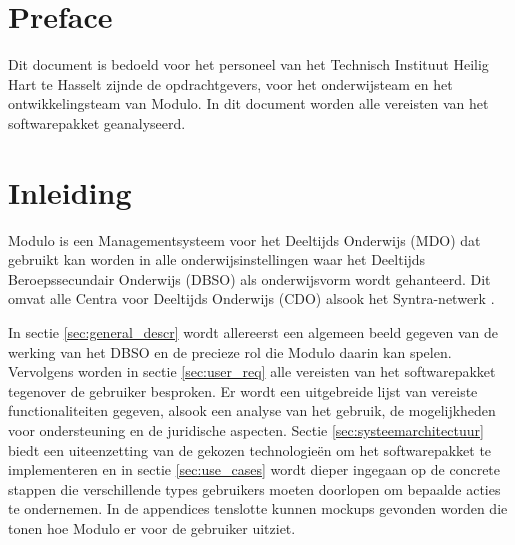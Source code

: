\documentclass[a4paper]{article}
\begin{document}


\tableofcontents
\newpage

\section{Preface}
Dit document is bedoeld voor het personeel van het Technisch Instituut Heilig Hart te Hasselt \cite{TIHH} zijnde de opdrachtgevers, voor het onderwijsteam en het ontwikkelingsteam van Modulo. In dit document worden alle vereisten van het softwarepakket geanalyseerd.


\section{Inleiding}
Modulo is een Managementsysteem voor het Deeltijds Onderwijs (MDO) dat gebruikt kan worden in alle onderwijsinstellingen waar het Deeltijds Beroepssecundair Onderwijs (DBSO) \cite{DBSO} als onderwijsvorm wordt gehanteerd. Dit omvat alle Centra voor Deeltijds Onderwijs (CDO) \cite{CDO} alsook het Syntra-netwerk \cite{Syntra}.


In sectie \ref{sec:general_descr} wordt allereerst een algemeen beeld gegeven van de werking van het DBSO en de precieze rol die Modulo daarin kan spelen. Vervolgens worden in sectie \ref{sec:user_req} alle vereisten van het softwarepakket tegenover de gebruiker besproken. Er wordt een uitgebreide lijst van vereiste functionaliteiten gegeven, alsook een analyse van het gebruik, de mogelijkheden voor ondersteuning en de juridische aspecten. Sectie \ref{sec:systeemarchitectuur} biedt een uiteenzetting van de gekozen technologieën om het softwarepakket te implementeren en in sectie \ref{sec:use_cases} wordt dieper ingegaan op de concrete stappen die verschillende types gebruikers moeten doorlopen om bepaalde acties te ondernemen. In de appendices tenslotte kunnen mockups gevonden worden die tonen hoe Modulo er voor de gebruiker uitziet.
\end{document}
